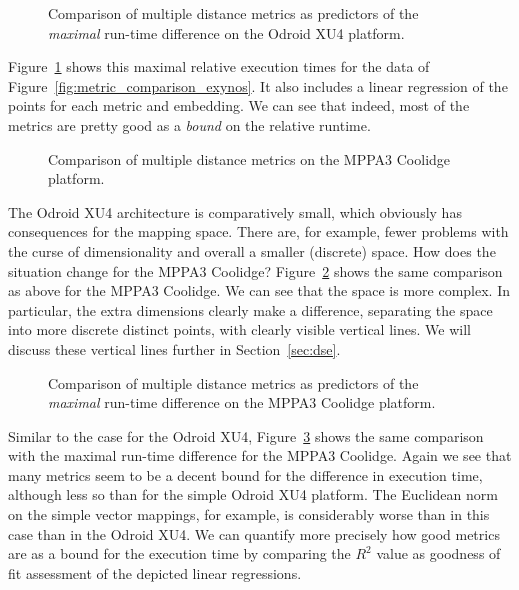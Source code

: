 \begin{figure}[h]
	\centering
	\caption{Comparison of multiple distance metrics as predictors of the \emph{maximal} run-time difference on the Odroid XU4 platform.}
	\label{fig:metric_comparison_max_exynos}
\end{figure}

Figure~\ref{fig:metric_comparison_max_exynos} shows this maximal relative execution times for the data of Figure~\ref{fig:metric_comparison_exynos}. 
It also includes a linear regression of the points for each metric and embedding.
We can see that indeed, most of the metrics are pretty good as a \emph{bound} on the relative runtime.

\begin{figure}[h]
	\centering
	\caption{Comparison of multiple distance metrics on the MPPA3 Coolidge platform.}
	\label{fig:metric_comparison_coolidge}
\end{figure}

The Odroid XU4 architecture is comparatively small, which obviously has consequences for the mapping space.
There are, for example, fewer problems with the curse of dimensionality and overall a smaller (discrete) space.
How does the situation change for the MPPA3 Coolidge?
Figure~\ref{fig:metric_comparison_coolidge} shows the same comparison as above for the MPPA3 Coolidge. 
We can see that the space is more complex.
In particular, the extra dimensions clearly make a difference, separating the space into more discrete distinct points, with clearly visible vertical lines.
We will discuss these vertical lines further in Section~\ref{sec:dse}.

\begin{figure}[h]
	\centering
	\caption{Comparison of multiple distance metrics as predictors of the \emph{maximal} run-time difference on the MPPA3 Coolidge platform.}
	\label{fig:metric_comparison_max_coolidge}
\end{figure}

Similar to the case for the Odroid XU4, Figure~\ref{fig:metric_comparison_max_coolidge} shows the same comparison with the maximal run-time difference for the MPPA3 Coolidge.
Again we see that many metrics seem to be a decent bound for the difference in execution time, although less so than for the simple Odroid XU4 platform.
The Euclidean norm on the simple vector mappings, for example, is considerably worse than in this case than in the Odroid XU4.
We can quantify more precisely how good metrics are as a bound for the execution time by comparing the $R^2$ value as goodness of fit assessment of the depicted linear regressions.


